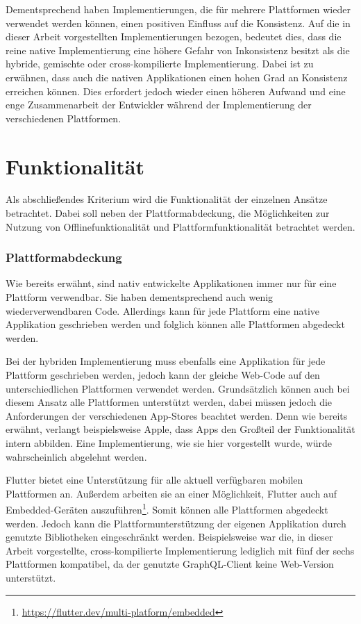 Dementsprechend haben Implementierungen, die für mehrere Plattformen wieder verwendet werden können, einen positiven Einfluss auf die Konsistenz.
Auf die in dieser Arbeit vorgestellten Implementierungen bezogen, bedeutet dies, dass die reine native Implementierung eine höhere Gefahr von Inkonsistenz besitzt als die hybride, gemischte oder cross-kompilierte Implementierung.
Dabei ist zu erwähnen, dass auch die nativen Applikationen einen hohen Grad an Konsistenz erreichen können. Dies erfordert jedoch wieder einen höheren Aufwand und eine enge Zusammenarbeit der Entwickler während der Implementierung der verschiedenen Plattformen.

\section{Funktionalität}
Als abschließendes Kriterium wird die Funktionalität der einzelnen Ansätze betrachtet. Dabei soll neben der Plattformabdeckung, die Möglichkeiten zur Nutzung von Offlinefunktionalität und Plattformfunktionalität betrachtet werden.

\subsubsection{Plattformabdeckung}
Wie bereits erwähnt, sind nativ entwickelte Applikationen immer nur für eine Plattform verwendbar. Sie haben dementsprechend auch wenig wiederverwendbaren Code. Allerdings kann für jede Plattform eine native Applikation geschrieben werden und folglich können alle Plattformen abgedeckt werden.

Bei der hybriden Implementierung muss ebenfalls eine Applikation für jede Plattform geschrieben werden, jedoch kann der gleiche Web-Code auf den unterschiedlichen Plattformen verwendet werden. Grundsätzlich können auch bei diesem Ansatz alle Plattformen unterstützt werden, dabei müssen jedoch die Anforderungen der verschiedenen App-Stores beachtet werden. Denn wie bereits erwähnt, verlangt beispielsweise Apple, dass Apps den Großteil der Funktionalität intern abbilden. Eine Implementierung, wie sie hier vorgestellt wurde, würde wahrscheinlich abgelehnt werden.

Flutter bietet eine Unterstützung für alle aktuell verfügbaren mobilen Plattformen an. Außerdem arbeiten sie an einer Möglichkeit, Flutter auch auf Embedded-Geräten auszuführen\footnote{\url{https://flutter.dev/multi-platform/embedded}}.
Somit können alle Plattformen abgedeckt werden. Jedoch kann die Plattformunterstützung der eigenen Applikation durch genutzte Bibliotheken eingeschränkt werden. Beispielsweise war die, in dieser Arbeit vorgestellte, cross-kompilierte Implementierung lediglich mit fünf der sechs Plattformen kompatibel, da der genutzte GraphQL-Client keine Web-Version unterstützt.

